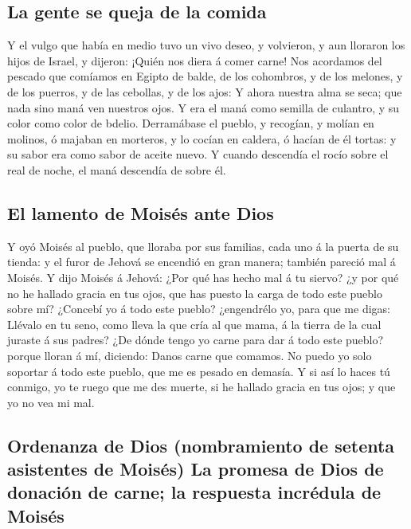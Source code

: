 \hypertarget{la-gente-se-queja-de-la-comida}{%
\subsection{La gente se queja de la
comida}\label{la-gente-se-queja-de-la-comida}}

 Y el vulgo que había en medio tuvo un vivo deseo, y
volvieron, y aun lloraron los hijos de Israel, y dijeron: ¡Quién nos
diera á comer carne!  Nos acordamos del pescado que comíamos
en Egipto de balde, de los cohombros, y de los melones, y de los
puerros, y de las cebollas, y de los ajos:  Y ahora nuestra
alma se seca; que nada sino maná ven nuestros ojos.  Y era
el maná como semilla de culantro, y su color como color de bdelio.
 Derramábase el pueblo, y recogían, y molían en molinos, ó
majaban en morteros, y lo cocían en caldera, ó hacían de él tortas: y su
sabor era como sabor de aceite nuevo.  Y cuando descendía el
rocío sobre el real de noche, el maná descendía de sobre él.

\hypertarget{el-lamento-de-moisuxe9s-ante-dios}{%
\subsection{El lamento de Moisés ante
Dios}\label{el-lamento-de-moisuxe9s-ante-dios}}

 Y oyó Moisés al pueblo, que lloraba por sus familias, cada
uno á la puerta de su tienda: y el furor de Jehová se encendió en gran
manera; también pareció mal á Moisés.  Y dijo Moisés á
Jehová: ¿Por qué has hecho mal á tu siervo? ¿y por qué no he hallado
gracia en tus ojos, que has puesto la carga de todo este pueblo sobre
mí?  ¿Concebí yo á todo este pueblo? ¿engendrélo yo, para
que me digas: Llévalo en tu seno, como lleva la que cría al que mama, á
la tierra de la cual juraste á sus padres?  ¿De dónde tengo
yo carne para dar á todo este pueblo? porque lloran á mí, diciendo:
Danos carne que comamos.  No puedo yo solo soportar á todo
este pueblo, que me es pesado en demasía.  Y si así lo
haces tú conmigo, yo te ruego que me des muerte, si he hallado gracia en
tus ojos; y que yo no vea mi mal.

\hypertarget{ordenanza-de-dios-nombramiento-de-setenta-asistentes-de-moisuxe9s-la-promesa-de-dios-de-donaciuxf3n-de-carne-la-respuesta-incruxe9dula-de-moisuxe9s}{%
\subsection{Ordenanza de Dios (nombramiento de setenta asistentes de
Moisés) La promesa de Dios de donación de carne; la respuesta incrédula
de
Moisés}\label{ordenanza-de-dios-nombramiento-de-setenta-asistentes-de-moisuxe9s-la-promesa-de-dios-de-donaciuxf3n-de-carne-la-respuesta-incruxe9dula-de-moisuxe9s}}

